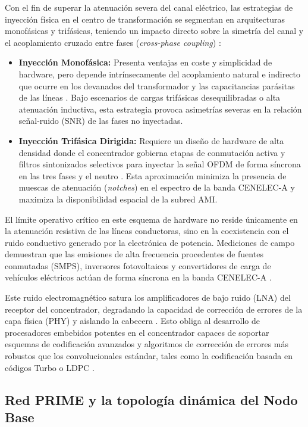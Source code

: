 Con el fin de superar la atenuación severa del canal eléctrico, las estrategias de inyección física en el centro de transformación se segmentan en arquitecturas monofásicas y trifásicas, teniendo un impacto directo sobre la simetría del canal y el acoplamiento cruzado entre fases (\textit{cross-phase coupling}) \cite{5764420}:
\begin{itemize}
    \item \textbf{Inyección Monofásica:} Presenta ventajas en coste y simplicidad de hardware, pero depende intrínsecamente del acoplamiento natural e indirecto que ocurre en los devanados del transformador y las capacitancias parásitas de las líneas \cite{5764420}. Bajo escenarios de cargas trifásicas desequilibradas o alta atenuación inductiva, esta estrategia provoca asimetrías severas en la relación señal-ruido (SNR) de las fases no inyectadas.
    \item \textbf{Inyección Trifásica Dirigida:} Requiere un diseño de hardware de alta densidad donde el concentrador gobierna etapas de conmutación activa y filtros sintonizados selectivos para inyectar la señal OFDM de forma síncrona en las tres fases y el neutro \cite{5764420}. Esta aproximación minimiza la presencia de muescas de atenuación (\textit{notches}) en el espectro de la banda CENELEC-A y maximiza la disponibilidad espacial de la subred AMI.
\end{itemize}

El límite operativo crítico en este esquema de hardware no reside únicamente en la atenuación resistiva de las líneas conductoras, sino en la coexistencia con el ruido conductivo generado por la electrónica de potencia. Mediciones de campo demuestran que las emisiones de alta frecuencia procedentes de fuentes conmutadas (SMPS), inversores fotovoltaicos y convertidores de carga de vehículos eléctricos actúan de forma síncrona en la banda CENELEC-A \cite{10104173}. 

Este ruido electromagnético satura los amplificadores de bajo ruido (LNA) del receptor del concentrador, degradando la capacidad de corrección de errores de la capa física (PHY) y aislando la cabecera \cite{10104173}. Esto obliga al desarrollo de procesadores embebidos potentes en el concentrador capaces de soportar esquemas de codificación avanzados y algoritmos de corrección de errores más robustos que los convolucionales estándar, tales como la codificación basada en códigos Turbo o LDPC \cite{9441595, 9820886}.

\subsection{Red PRIME y la topología dinámica del Nodo Base}
\label{subsec:estructura_PRIME}

